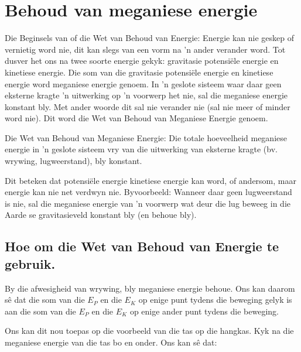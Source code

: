\section{Behoud van meganiese energie }
            \nopagebreak

 { Die Beginsels van of die Wet van Behoud van Energie: Energie kan nie geskep of vernietig word nie, dit kan slegs van een vorm na  'n ander verander word.  } 
        \label{m38786*id68483}Tot dusver het ons na twee soorte energie gekyk: gravitasie potensiële energie en kinetiese energie. Die som van die gravitasie potensiële energie en kinetiese energie word meganiese energie genoem. In  'n geslote sisteem waar daar geen eksterne kragte 'n uitwerking op  'n voorwerp het nie, sal die meganiese energie konstant bly. Met ander woorde dit sal nie verander nie (sal nie meer of minder word nie). Dit word die Wet van Behoud van Meganiese Energie genoem. 

 { Die Wet van Behoud van Meganiese Energie:  Die totale hoeveelheid meganiese energie in  'n geslote sisteem vry van die uitwerking van eksterne kragte (bv. wrywing, lugweerstand), bly konstant.  } 

Dit beteken dat potensiële energie kinetiese energie kan word, of andersom, maar energie kan nie net verdwyn nie. Byvoorbeeld: Wanneer daar geen lugweerstand is nie, sal die meganiese energie van  'n voorwerp wat deur die lug beweeg in die Aarde se gravitasieveld konstant bly (en behoue bly).




\subsection*{Hoe om die Wet van Behoud van Energie te gebruik.}
            \nopagebreak
        \label{m38786*id68660}By die afwesigheid van wrywing, bly meganiese energie behoue. Ons kan daarom sê dat die som van die ${E}_{P}$ en die ${E}_{K}$ op enige punt tydens die beweging gelyk is aan die som van die ${E}_{P}$ en die ${E}_{K}$ op enige ander punt tydens die beweging.\par 
        \label{m38786*id68713}Ons kan dit nou toepas op die voorbeeld van die tas op die hangkas. Kyk na die meganiese energie van die tas bo en onder. Ons kan s\^{e} dat:\par 

